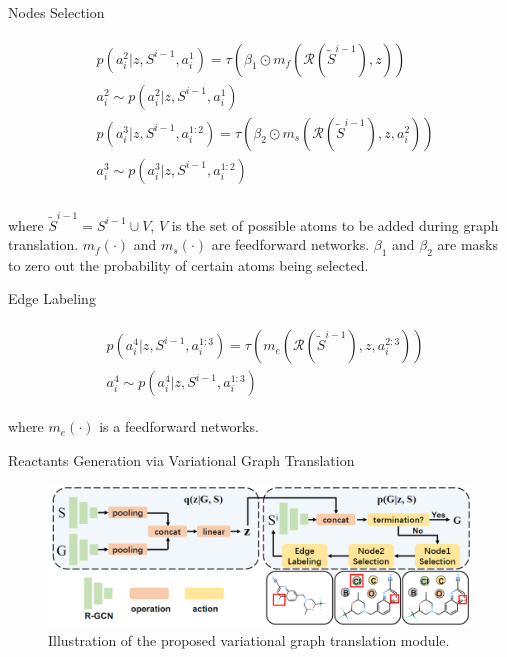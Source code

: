 \documentclass{beamer}		%
\begin{document}
\begin{frame}{Nodes Selection}

\begin{eqnarray*}
\begin{aligned}
&p(a_i^2|z,S^{i-1},a_i^1)=\tau(\beta_1 \odot m_f(\mathcal{R}(\tilde{S}^{i-1}), z))\\
&a_i^2 \sim p(a_i^2|z,S^{i-1},a_i^1)\\
&p(a_i^3|z,S^{i-1},a_i^{1:2})=\tau(\beta_2 \odot m_s(\mathcal{R}(\tilde{S}^{i-1}), z,a_i^2))\\
&a_i^3 \sim p(a_i^3|z,S^{i-1},a_i^{1:2})\\
\end{aligned}    
\end{eqnarray*}

where $\tilde{S}^{i-1} = S^{i-1} \cup V$, $V$ is the set of possible atoms to be added during graph translation. $m_f(\cdot)$ and $m_s(\cdot)$ are feedforward networks. $\beta_1$ and $\beta_2$ are masks to zero out the probability of certain atoms
being selected.

\end{frame}






\begin{frame}{Edge Labeling}

\begin{eqnarray*}
\begin{aligned}
&p(a_i^4|z,S^{i-1},a_i^{1:3})=\tau(m_e(\mathcal{R}(\tilde{S}^{i-1}), z, a_i^{2:3}))\\
&a_i^4 \sim p(a_i^4|z,S^{i-1},a_i^{1:3})
\end{aligned}    
\end{eqnarray*}

where $m_e(\cdot)$ is a feedforward networks.

\end{frame}






\begin{frame}{Reactants Generation via Variational Graph Translation}

\begin{figure}[t]
\centerline{\includegraphics[width=1.0\linewidth]{figure2.png}}
\label{fig2}
\caption{Illustration of the proposed variational graph translation module.}
\end{figure}

\end{frame}
\end{document}
